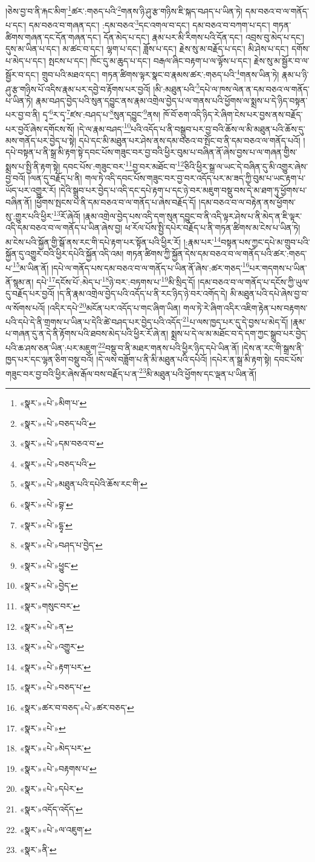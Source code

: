 །ཅེས་བྱ་བ་ནི་རྐང་མིག་\footnote{«སྣར་»«པེ་»མིག་པ་}ཚར་:གཅད་པའི་\footnote{«སྣར་»«པེ་»བཅད་པའི་}གནས་ཉི་ཤུ་རྩ་གཉིས་ཇི་སྐད་བཤད་པ་ཡིན་ཏེ། དམ་བཅའ་བ་ལ་གནོད་པ་དང་། དམ་བཅའ་བ་གཞན་དང་། :དམ་བཅའ་\footnote{«སྣར་»«པེ་»དམ་བཅའ་བ་}དང་འགལ་བ་དང་། དམ་བཅའ་བ་བཀག་པ་དང་། གཏན་ཚིགས་གཞན་དང་དོན་གཞན་དང་། དོན་མེད་པ་དང་། རྣམ་པར་མི་རིགས་པའི་དོན་དང་། འབྲས་བུ་མེད་པ་དང་། དུས་མ་ཡིན་པ་དང་། མ་ཚང་བ་དང་། ལྷག་པ་དང་། ཟློས་པ་དང་། རྗེས་སུ་མ་བརྗོད་པ་དང་། མི་ཤེས་པ་དང་། དགོས་པ་མེད་པ་དང་། སྤངས་པ་དང་། ཁོང་དུ་མ་ཆུད་པ་དང་། བརྒལ་ཞིང་བརྟག་པ་ལ་ལྟོས་པ་དང་། རྗེས་སུ་མ་སྦྱོར་བ་ལ་སྦྱོར་བ་དང་། གྲུབ་པའི་མཐའ་དང་། གཏན་ཚིགས་ལྟར་སྣང་བ་རྣམས་ཚར་:གཅད་པའི་\footnote{«སྣར་»«པེ་»བཅད་པའི་}གནས་ཡིན་ཏེ། རྣམ་པ་ཉི་ཤུ་རྩ་གཉིས་པོ་འདིས་རྣམ་པར་དབྱེ་བ་རྟོགས་པར་བྱའོ། །མི་:མཐུན་པའི་\footnote{«སྣར་»«པེ་»མཐུན་པའི་དཔེའི་ཆོས་རང་གི་}དཔེ་ལ་ཁས་ལེན་ན་དམ་བཅའ་ལ་གནོད་པ་ཡིན་ཏེ། རྣམ་བཤད་བྱེད་པའི་སུན་དབྱུང་ནས་རྣམ་འགྲེལ་བྱེད་པ་ལ་གནས་པའི་ཕྱོགས་ལ་སྨྲས་པ་དེ་ཉིད་བསྟན་པར་བྱ་བ་ནི། དྭ་\footnote{«སྣར་»«པེ་»བྷ་}ར་དྭ་\footnote{«སྣར་»«པེ་»དྷྭ་}ཛས་:བཤད་པ་\footnote{«སྣར་»«པེ་»བཤད་པ་བྱེད་}སུན་དབྱུང་\footnote{«སྣར་»«པེ་»ཕྱུང་}ནས། ཁོ་བོ་ཅག་འདི་ཉིད་རེ་ཞིག་ངེས་པར་བྱས་ནས་བརྗོད་པར་བྱའོ་ཞེས་དགོངས་སོ། །དེ་ལ་རྣམ་བཤད་\footnote{«སྣར་»«པེ་»བྱེད་}པའི་འདོད་པ་ནི་བསྒྲུབ་པར་བྱ་བའི་ཆོས་ལ་མི་མཐུན་པའི་ཆོས་དུ་མས་གནོད་པར་བྱེད་པ་སྟེ། དཔེ་དང་མི་མཐུན་པར་ཤེས་ནས་དམ་བཅའ་བ་སྤོང་བ་ནི་དམ་བཅའ་ལ་གནོད་པའོ། །དཔེ་བསྟན་པ་ནི་སྒྲ་མི་རྟག་སྟེ་དབང་པོས་གཟུང་བར་བྱ་བའི་ཕྱིར་བུམ་པ་བཞིན་ནོ་ཞེས་བྱས་པ་ལ་གཞན་གྱིས་སྨྲས་པ་སྤྱི་ནི་རྟག་སྟེ། དབང་པོས་:གཟུང་བར་\footnote{«སྣར་»གསུང་བར་}བྱ་བར་མཐོང་བ་\footnote{«སྣར་»«པེ་»ན་}ཅིའི་ཕྱིར་སྒྲ་ལ་ཡང་དེ་བཞིན་དུ་མི་འགྱུར་ཞེས་བྱ་བའོ། །ལན་དུ་བརྗོད་པ་ནི། གལ་ཏེ་འདི་དབང་པོས་གཟུང་བར་བྱ་བར་འདོད་པར་མ་ཟད་ཀྱི་བུམ་པ་ཡང་རྟག་པ་ཡོད་པར་འགྱུར་རོ། །དེའི་སྒྲུབ་པར་བྱེད་པ་འདི་དང་དཔེ་རྟག་པ་དང་ཉེ་བར་མཇུག་བསྡུ་བས་དེ་མ་ཐག་ཏུ་ཕྱོགས་པ་བཞིན་ནོ། །ཕྱོགས་སྤངས་པ་ནི་དམ་བཅའ་བ་ལ་གནོད་པ་ཞེས་བརྗོད་དོ། །དམ་བཅའ་བ་ལ་བརྟེན་ནས་ཕྱོགས་སུ་:གྱུར་པའི་ཕྱིར་\footnote{«སྣར་»«པེ་»འགྱུར་}རོ་ཞེའོ། །རྣམ་འགྲེལ་བྱེད་པས་འདི་དག་སུན་དབྱུང་བ་ནི་འདི་ལྟར་ཤེས་པ་ནི་མེད་ན་ཇི་ལྟར་འདི་དམ་བཅའ་བ་ལ་གནོད་པ་ཡིན་ཞེས་བྱ། ཕ་རོལ་པོས་སྤྱི་དཔེར་བརྗོད་པ་ནི་གཏན་ཚིགས་མ་ངེས་པ་ཡིན་ཏེ། མ་ངེས་པའི་སྐྱོན་གྱི་སྒོ་ནས་རང་གི་དཔེ་རྟག་པར་སྟོན་པའི་ཕྱིར་རོ། །:རྣམ་པར་\footnote{«སྣར་»«པེ་»རྟག་པར་}བསྟན་པས་ཀྱང་དཔེ་མ་གྲུབ་པའི་སྐྱོན་དུ་འགྱུར་བའི་ཕྱིར་དཔེའི་སྐྱོན་འདི་འམ། གཏན་ཚིགས་ཀྱི་སྐྱོན་དེས་དམ་བཅའ་བ་ལ་གནོད་པའི་ཚར་:གཅད་པ་\footnote{«སྣར་»«པེ་»བཅད་པ་}མ་ཡིན་ནོ། །དཔེ་ལ་གནོད་པས་དམ་བཅའ་བ་ལ་གནོད་པ་ཡིན་ནོ་ཞེས་:ཚར་གཅད་\footnote{«སྣར་»ཚར་བ་བཅད་«པེ་»ཚར་བཅད་}པར་གདགས་པ་ཡིན་ནོ་སྙམ་ན། དཔེ་\footnote{«སྣར་»«པེ་»}དངོས་པོ་:མེད་པ་\footnote{«སྣར་»«པེ་»མེད་པར་}ཉེ་བར་:བཏགས་པ་\footnote{«སྣར་»«པེ་»བརྟགས་པ་}མི་སྲིད་དོ། །དམ་བཅའ་བ་ལ་གནོད་པ་དངོས་ཀྱི་ཡུལ་དུ་བརྗོད་པར་བྱའོ། །ད་ནི་རྣམ་འགྲེལ་བྱེད་པའི་འདོད་པ་ནི་རང་ཉིད་ཉེ་བར་འགོད་དེ། མི་མཐུན་པའི་དཔེ་ཞེས་བྱ་བ་ལ་སོགས་པའོ། །འདིར་དཔེ་\footnote{«སྣར་»«པེ་»དཔེར་}མངོན་པར་འདོད་པ་གང་ཞིག་ཡིན། གལ་ཏེ་རེ་ཞིག་འདིར་འཇིག་རྟེན་པས་བརྟགས་པའི་དཔེ་དེ་ནི་གྲགས་པ་ཡིན་པ་དེའི་ཚེ་བཤད་པར་བྱེད་པའི་འདོད་\footnote{«སྣར་»འདོད་འདོད་}པ་ལས་ཁྱད་པར་དུ་དེ་བྱས་པ་མེད་དོ། །རྣམ་པ་གཞན་དུ་ན་དེ་ནི་རྟོགས་པའི་ཐབས་མེད་པའི་ཕྱིར་རོ་ཞེ་ན། སྨྲས་པ་དེ་ལ་མ་མཐོང་བ་དེ་དག་ཀྱང་སྒྲུབ་པར་བྱེད་པའི་ཆ་ཤས་ཅན་ཡིན་:པར་མཇུག་\footnote{«སྣར་»«པེ་»ལ་འཇུག་}བསྡུ་བ་ནི་མཐར་གནས་པའི་ཕྱིར་ཉིད་དཔེ་ཡིན་ནོ། །དེས་ན་རང་གི་སྒྲས་ནི་ཁྱད་པར་དང་ལྷན་ཅིག་བསྡུ་བའོ། །དེ་ལས་བཟློག་པ་ནི་མི་མཐུན་པའི་དཔེའོ། །དཔེར་ན་སྒྲ་མི་རྟག་སྟེ། དབང་པོས་གཟུང་བར་བྱ་བའི་ཕྱིར་ཞེས་རྒོལ་བས་བརྗོད་པ་ན་\footnote{«སྣར་»ནི་}མི་མཐུན་པའི་ཕྱོགས་དང་ལྡན་པ་ཡིན་ནོ། 